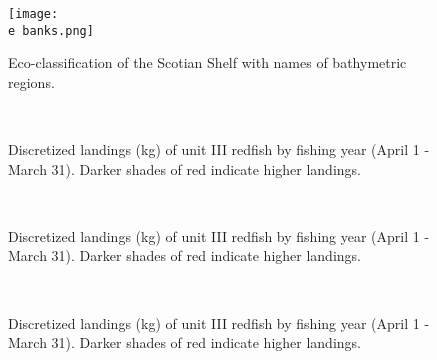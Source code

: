 \documentclass[11pt]{article}
\newcommand{\D}{.}
\newcommand{\e}{/home/ecomod_data/redfish/figures/}
\begin{document}
\begin{landscape}

\begin{figure}
\centering
    \texttt{[image: \\e banks.png]}
    \caption{Eco-classification of the Scotian Shelf with names of bathymetric regions.}

\end{figure}


\begin{figure}
\centering
{}
\\
\caption{Discretized landings (kg) of unit III redfish by fishing year (April 1 - March 31). Darker shades of red indicate higher landings.}
\end{figure}
\clearpage

\begin{figure}
\centering
{}
\\
\caption{Discretized landings (kg) of unit III redfish by fishing year (April 1 - March 31). Darker shades of red indicate higher landings.}
\end{figure}
\clearpage

\begin{figure}
\centering
{}
\\
\caption{Discretized landings (kg) of unit III redfish by fishing year (April 1 - March 31). Darker shades of red indicate higher landings.}
\end{figure}
\clearpage
\end{landscape}
\end{document}
